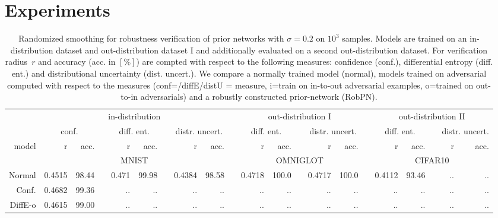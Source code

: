 
\section{Experiments}



\begin{table*}
	\centering
	\caption{Randomized smoothing for robustness verification of prior networks with $\sigma=0.2$ on $10^3$ samples. Models are trained on an in-distribution dataset and out-distribution dataset I and additionally evaluated on a second out-distribution dataset. For verification radius~$r$ and accuracy (acc. in $[\%]$) are compted with respect to the following measures: confidence (conf.), differential entropy (diff. ent.) and distributional uncertainty (dist. uncert.). We compare a normally trained model (normal), models trained on adversarial computed with respect to the measures (conf=/diffE/distU = measure, i=train on in-to-out adversarial examples, o=trained on out-to-in adversarials) and a robustly constructed prior-network (RobPN).}
	\begin{tiny}
		\begin{tabular}{@{}rrrcrrcrrcrrcrrcrrcrr@{}}
			\toprule
			& \multicolumn{8}{c}{in-distribution} &  & \multicolumn{5}{c}{out-distribution I} &   & \multicolumn{5}{c}{out-distribution II} \\
			\cmidrule{2-9} \cmidrule{11-15} \cmidrule{17-21}
			& \multicolumn{2}{c}{conf.} &   & \multicolumn{2}{c}{diff. ent.} &   & \multicolumn{2}{c}{distr. uncert.} &   
			& \multicolumn{2}{c}{diff. ent.} &   & \multicolumn{2}{c}{distr. uncert.} & 
			& \multicolumn{2}{c}{diff. ent.} &   & \multicolumn{2}{c}{distr. uncert.} \\
			\cmidrule{2-3}  \cmidrule{5-6} \cmidrule{8-9} \cmidrule{11-12}  \cmidrule{14-15} \cmidrule{17-18} \cmidrule{20-21}
			model & r & acc. & & r & acc. &  & r & acc. & & r & acc. & & r & acc. & & r & acc. & & r & acc. \\
			\midrule
			& \multicolumn{8}{c}{MNIST} & & \multicolumn{5}{c}{OMNIGLOT} & & \multicolumn{5}{c}{CIFAR10} \\
			Normal     & 0.4515 & 98.44 & & 0.471 & 99.98 & & 0.4384 & 98.58 & & 0.4718 & 100.0 & & 0.4717 & 100.0 & & 0.4112 & 93.46 & & .. & .. \\
			Conf.      & 0.4682 & 99.36 & & .. & .. & & .. & .. & & .. & .. & & .. & .. & & .. & .. & & .. & .. \\
			DiffE-o    & 0.4615 & 99.00 & & .. & .. & & .. & .. & & .. & .. & & .. & .. & & .. & .. & & .. & .. \\

\end{tabular}
\end{tiny}
\end{table*}
